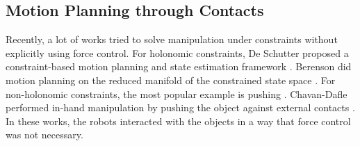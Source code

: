 \subsection{Motion Planning through Contacts} %
\label{sub:motion_planning_through_contacts}
Recently, a lot of works tried to solve manipulation under constraints without explicitly using force control. For holonomic constraints, De Schutter \etal proposed a constraint-based motion planning and state estimation framework \cite{de2007constraint}. Berenson \etal did motion planning on the reduced manifold of the constrained state space \cite{berenson2009manipulation}. For non-holonomic constraints, the most popular example is pushing \cite{lynch-mason-pushing,zhou2016convex,dogar2011framework}. Chavan-Dafle \etal performed in-hand manipulation by pushing the object against external contacts \cite{prehensile}. In these works, the robots interacted with the objects in a way that force control was not necessary.

